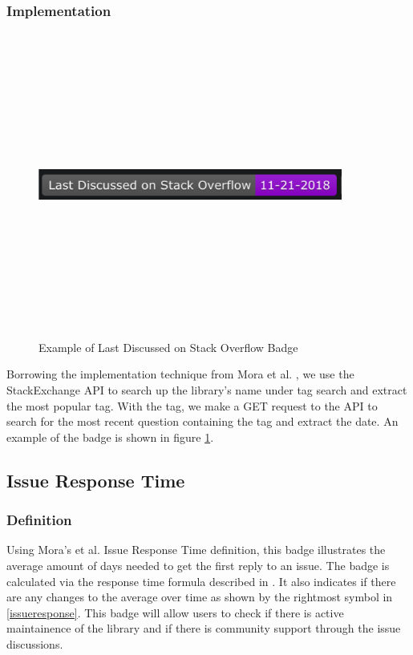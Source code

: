 \documentclass[12pt, letterpaper]{article}
\begin{document}
\subsubsection{Implementation}

\begin{figure}[!htb]
    \centerline{
        \includegraphics[width=10cm,height=10cm,keepaspectratio=true]{lastdiscussedbadge}
    }
    \caption{
        Example of Last Discussed on Stack Overflow Badge
    }
    \label{lastdiscussed}
\end{figure}

Borrowing the implementation technique from Mora et al. \cite{metrics}, we use the StackExchange API \cite{stackexchangeapi}
to search up the library's name under tag search and extract the most popular tag.
With the tag, we make a GET request to the API to search for the most recent question containing the tag
and extract the date. An example of the badge is shown in figure \ref{lastdiscussed}.

\subsection{Issue Response Time}
\subsubsection{Definition}
Using Mora's et al. \cite{metrics} Issue Response Time definition, this badge illustrates the average
amount of days needed to get the first reply to an issue. The badge is calculated via the response time
formula described in \cite{metrics}. It also indicates if there are any changes to the average over time 
as shown by the rightmost symbol in \ref{issueresponse}. 
This badge will allow users to check if there is active maintainence of the library and if there is community support
through the issue discussions. 
\end{document}
